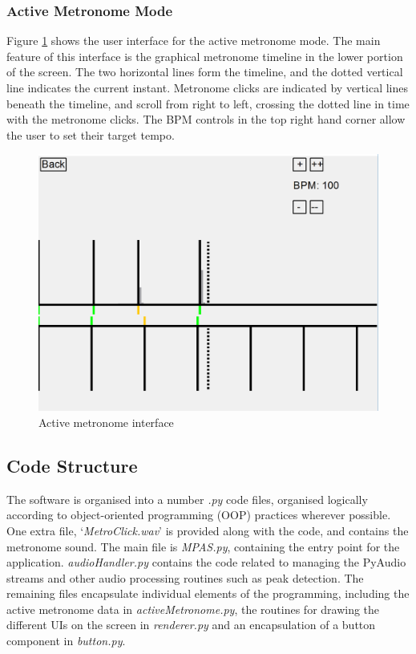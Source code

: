 \documentclass[hidelinks,12pt]{article}
\begin{document}
\subsubsection{Active Metronome Mode}
Figure \ref{fig:ActiveMetronomeScreenshot} shows the user interface for the active metronome mode. The main feature of this interface is the graphical metronome timeline in the lower portion of the screen. The two horizontal lines form the timeline, and the dotted vertical line indicates the current instant. Metronome clicks are indicated by vertical lines beneath the timeline, and scroll from right to left, crossing the dotted line in time with the metronome clicks. The BPM controls in the top right hand corner allow the user to set their target tempo.

\begin{figure}[H]
	\begin{center}
		\includegraphics[scale=0.5]{ActiveMetronomeScreenshot.png}
		\caption{Active metronome interface}
		\label{fig:ActiveMetronomeScreenshot}
	\end{center}
\end{figure}


\subsection{Code Structure}
The software is organised into a number \textit{.py} code files, organised logically according to object-oriented programming (OOP) practices wherever possible. One extra file, `\textit{MetroClick.wav}' is provided along with the code, and contains the metronome sound. The main file is \textit{MPAS.py}, containing the entry point for the application. \textit{audioHandler.py} contains the code related to managing the PyAudio streams and other audio processing routines such as peak detection. The remaining files encapsulate individual elements of the programming, including the active metronome data in \textit{activeMetronome.py}, the routines for drawing the different UIs on the screen in \textit{renderer.py} and an encapsulation of a button component in \textit{button.py}.
\end{document}
